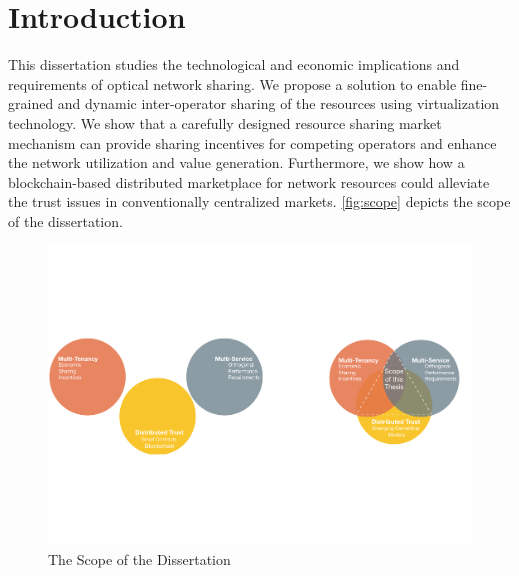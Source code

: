 \chapter*{Introduction}%
This dissertation studies the technological and economic implications and requirements of optical network sharing. We propose a solution to enable fine-grained and dynamic inter-operator sharing of the resources using virtualization technology. We show that a carefully designed resource sharing market mechanism can provide sharing incentives for competing operators and enhance the network utilization and value generation. Furthermore, we show how a blockchain-based distributed marketplace for network resources could alleviate the trust issues in conventionally centralized markets. \autoref{fig:scope} depicts the scope of the dissertation.

\begin{figure}[tbhp]
\centering
\includegraphics[width=0.6\linewidth]{Figures/scope.pdf}
\caption{The Scope of the Dissertation}
\label{fig:scope}
\end{figure}




